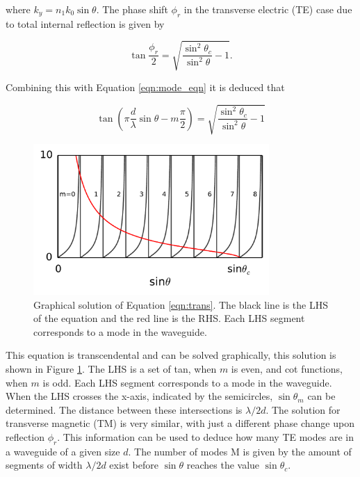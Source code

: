 where $k_y = n_1 k_0 \sin{\theta}$. The phase shift $\phi_r$ in the transverse
electric (TE) case due to total internal reflection is given by

\begin{equation} \tan{\frac{\phi_r}{2}} =
\sqrt{\frac{\sin^2\theta_c}{\sin^2\theta} - 1}. \end{equation}

Combining this with Equation \ref{eqn:mode_eqn} it is deduced that

\begin{equation}\label{eqn:trans} \tan \left( \pi \frac{d}{\lambda} \sin \theta -
m \frac{\pi}{2} \right) = \sqrt{\frac{\sin^2\theta_c}{\sin^2\theta} - 1}
\end{equation}

\begin{figure}[h!] \begin{center}
\includegraphics[width=0.8\textwidth]{images/mode.pdf} \end{center}
\caption{Graphical solution of Equation \ref{eqn:trans}. The black line is the
LHS of the equation and the red line is the RHS. Each LHS segment corresponds to
a mode in the waveguide.} \label{fig:mode} \end{figure}

This equation is transcendental and can be solved graphically, this solution is
shown in Figure \ref{fig:mode}. The LHS is a set of tan, when $m$ is even, and
cot functions, when $m$ is odd. Each LHS segment corresponds to a mode in the
waveguide. When the LHS crosses the x-axis, indicated by the semicircles, $\sin
\theta_m$ can be determined. The distance between these intersections is
$\lambda/2d$. The solution for transverse magnetic (TM) is very similar, with
just a different phase change upon reflection $\phi_r$. This information can be
used to deduce how many TE modes are in a waveguide of a given size $d$. The
number of modes M is given by the amount of segments of width $\lambda/2d$ exist
before $\sin \theta$ reaches the value $\sin \theta_c$.

